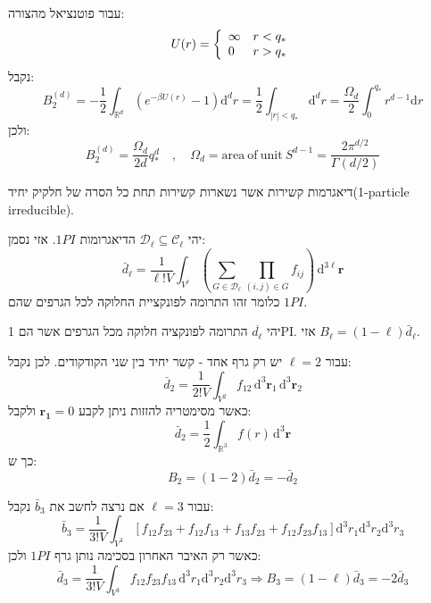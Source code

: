\documentclass{tstextbook}
\begin{document}
\begin{example}
עבור פוטנציאל מהצורה:
$$U(r)=\left\{\begin{array}{l l}{{\infty}}&{{r<q_{*}}}\\ {{0}}&{{r>q_{*}}}\end{array}\right.$$
נקבל:
$$B_{2}^{(d)}=-{\frac{1}{2}}\int_{\mathbb{R}^{d}}\left(e^{-\beta U(r)}-1\right)\mathrm{d}^{d}r={\frac{1}{2}}\int_{|r|<q_{*}}\mathrm{d}^{d}r={\frac{\Omega_{d}}{2}}\int_{0}^{q_{*}}r^{d-1}\mathrm{d}r$$
ולכן:
$$B_{2}^{(d)}=\frac{\Omega_{d}}{2d}q_{*}^{d}\quad,\quad\Omega_{d}=\mathrm{area~of~unit~}S^{d-1}={\frac{2\pi^{d/2}}{\Gamma(d/2)}}$$

\end{example}
\begin{definition}[דיאגרמה 1PI]
דיאגרמות קשירות אשר נשארות קשירות תחת כל הסרה של חלקיק יחיד(1-particle irreducible).

\end{definition}
\begin{symbolize}
יהי \(\mathcal{D}_{\ell}\subseteq \mathcal{C}_{\ell}\) הדיאגרומות \(1PI\). אזי נסמן:
$$\bar{d}_{\ell}=\frac{1}{\ell!V}\int_{V^{\ell}}\left(\sum_{G\in\mathcal{D}_{\ell}}\prod_{(i,j)\in G}f_{i j}\right)\,\mathrm{d}^{3\ell}\mathbf{r}$$
כלומר זהו התרומה לפונקציית החלוקה לכל הגרפים שהם \(1PI\).

\end{symbolize}
\begin{theorem}
יהי \(\overline{d_{\ell}}\) התרומה לפונקציה חלוקה מכל הגרפים אשר הם 1PI. אזי \(B_{\ell}=(1-\ell)\bar{d}_{\ell}\).

\end{theorem}
\begin{example}
עבור \(\ell=2\) יש רק גרף אחד - קשר יחיד בין שני הקודקודים. לכן נקבל:
$${\bar{d}}_{2}={\frac{1}{2!V}}\int_{V^{2}}f_{12}\,\mathrm{d}^{3}\mathbf{r}_{1}\,\mathrm{d}^{3}\mathbf{r}_{2}$$
כאשר מסימטריה להזזות ניתן לקבע \(\mathbf{r_{1}}=0\) ולקבל:
$${\bar{d}}_{2}={\frac{1}{2}}\int_{\mathbb{R}^{3}}f(r)\,\mathrm{d}^{3}\mathbf{r}$$
כך ש:
$$B_{2}=(1-2)\bar{d}_{2}=-\bar{d}_{2}$$

\end{example}
\begin{example}
עבור \(\ell=3\) אם נרצה לחשב את \({\bar{b}_{3}}\) נקבל:
$$\bar{b}_{3}=\frac{1}{3!V}\int_{V^{3}}\left[f_{12}f_{23}+f_{12}f_{13}+f_{13}f_{23}+f_{12}f_{23}f_{13}\right]\mathrm{d}^{3}r_{1}\mathrm{d}^{3}r_{2}\mathrm{d}^{3}r_{3}$$
כאשר רק האיבר האחרון בסכימה נותן גרף \(1PI\) ולכן:
$$\bar{d}_{3}=\frac{1}{3!V}\int_{V^{3}}f_{12}f_{23}f_{13}\,\mathrm{d}^{3}r_{1}\mathrm{d}^{3}r_{2}\mathrm{d}^{3}r_{3}\Rightarrow B_{3}=\left( 1-\ell \right)\bar{d}_{3} =-2\bar{d}_{3}$$

\end{example}
\end{document}
